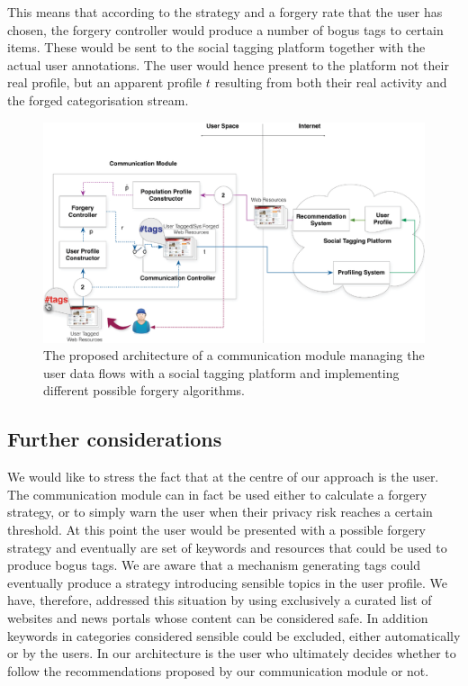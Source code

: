 This means that according to the strategy and a forgery rate that the user has chosen, the forgery controller would produce a number of bogus tags to certain items. These would be sent to the social tagging platform together with the actual user annotations. The user would hence present to the platform not their real profile, but an apparent profile $t$ resulting from both their real activity and the forged categorisation stream.

\begin{figure}[htb]  
\includegraphics[width=\textwidth]{figures/architecture.eps}
\caption[Architecture.]{The proposed architecture of a communication module managing the user data flows with a social tagging platform and implementing different possible forgery algorithms.}
\label{fig:architecture}
\end{figure}

\subsection{Further considerations}
\label{sec:further-considerations}
\noindent
We would like to stress the fact that at the centre of our approach is the user. The communication module can in fact be used either to calculate a forgery strategy, or to simply warn the user when their privacy risk reaches a certain threshold. At this point the user would be presented with a possible forgery strategy and eventually are set of keywords and resources that could be used to produce bogus tags. We are aware that a mechanism generating tags could eventually produce a strategy introducing sensible topics in the user profile. We have, therefore, addressed this situation by using exclusively a curated list of websites and news portals whose content can be considered safe. In addition keywords in categories considered sensible could be excluded, either automatically or by the users. In our architecture is the user who ultimately decides whether to follow the recommendations proposed by our communication module or not. 

